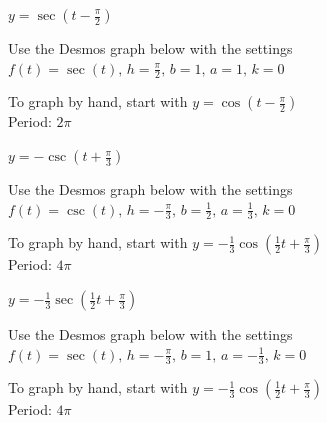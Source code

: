 \documentclass{ximera}
\begin{document}
\begin{question}
\begin{problem}
    $y = \sec \left( t - \frac{\pi}{2} \right)$

\begin{solution}
Use the Desmos graph below with the settings $f(t)=\sec(t),\,h=\frac{\pi}{2},\,b=1,\,a=1,\,k=0$

\begin{center} 
\end{center}

To graph by hand, start with $y = \cos \left( t - \frac{\pi}{2} \right)$\\
Period: $2\pi$\\

\end{solution}
\end{problem}

\begin{problem}
    $y = -\csc \left( t + \frac{\pi}{3} \right)$ 

\begin{solution}
Use the Desmos graph below with the settings $f(t)=\csc(t),\,h=-\frac{\pi}{3},\,b=\frac{1}{2},\,a=\frac{1}{3},\,k=0$

\begin{center} 
\end{center}

To graph by hand, start with $y = -\frac{1}{3}\cos \left( \frac{1}{2}t + \frac{\pi}{3} \right)$\\
Period: $4\pi$

\end{solution}
\end{problem}

\begin{problem}
    $y = -\frac{1}{3} \sec \left( \frac{1}{2}t + \frac{\pi}{3} \right)$

\begin{solution}
Use the Desmos graph below with the settings $f(t)=\sec(t),\,h=-\frac{\pi}{3},\,b=1,\,a=-\frac{1}{3},\,k=0$

\begin{center} 
\end{center}

To graph by hand, start with $y = -\frac{1}{3}\cos \left( \frac{1}{2}t + \frac{\pi}{3} \right)$\\
Period: $4\pi$

\end{solution}
\end{problem}


\end{question}
\end{document}

